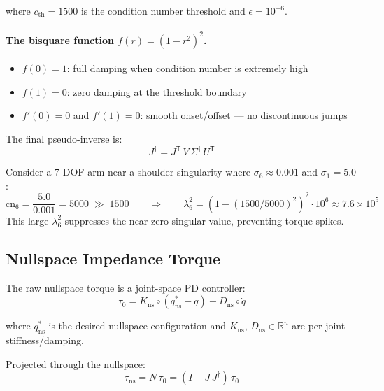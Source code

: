 \documentclass[11pt,a4paper]{article}
\newcommand{\R}{\mathbb{R}}
\newcommand{\tr}{\mathsf{T}}
\newcommand{\odot}{\circ}  %
\begin{document}
where $c_{\text{th}} = 1500$ is the condition number threshold and
$\epsilon = 10^{-6}$.

\paragraph{The bisquare function $f(r) = (1 - r^2)^2$.}
\begin{itemize}[nosep]
  \item $f(0) = 1$: full damping when condition number is extremely high
  \item $f(1) = 0$: zero damping at the threshold boundary
  \item $f'(0) = 0$ and $f'(1) = 0$: smooth onset/offset --- no discontinuous jumps
\end{itemize}

The final pseudo-inverse is:
\begin{equation}
  J^\dagger = J^\tr \, V \, \Sigma^\dagger \, U^\tr
  \label{eq:pinv}
\end{equation}

\begin{examplebox}
Consider a 7-DOF arm near a shoulder singularity where
$\sigma_6 \approx 0.001$ and $\sigma_1 = 5.0$:
\[
  \text{cn}_6 = \frac{5.0}{0.001} = 5000 \;\gg\; 1500
  \qquad\Longrightarrow\qquad
  \lambda_6^2 = \left(1 - (1500/5000)^2\right)^2 \cdot 10^6
  \approx 7.6\!\times\!10^5
\]
This large $\lambda_6^2$ suppresses the near-zero singular value, preventing
torque spikes.
\end{examplebox}

\subsection{Nullspace Impedance Torque}

The raw nullspace torque is a joint-space PD controller:
\begin{equation}
  \tau_0
  = K_{\text{ns}} \odot (q_{\text{ns}}^* - q) - D_{\text{ns}} \odot \dot{q}
  \label{eq:ns_raw}
\end{equation}

where $q_{\text{ns}}^*$ is the desired nullspace configuration and
$K_{\text{ns}},\,D_{\text{ns}} \in \R^n$ are per-joint stiffness/damping.

Projected through the nullspace:
\begin{equation}
  \tau_{\text{ns}} = N\,\tau_0
  = (I - J\,J^\dagger)\,\tau_0
  \label{eq:ns_projected}
\end{equation}
\end{document}

